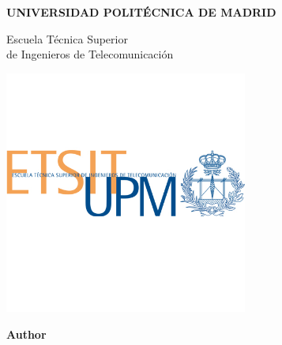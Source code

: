 \thispagestyle{empty}
\large
\begin{center}

  \Huge\textbf{UNIVERSIDAD POLITÉCNICA DE MADRID}

  \vspace{7mm}

  \huge{Escuela Técnica Superior\\de Ingenieros de Telecomunicación}

  \vspace{1cm}
  
  \centerline{\includegraphics[width=80mm]{logos/logoetsit_tamano.jpg}}


  \Large\textbf{\mybooktitle}

  
  {
    \textbf {Author}
  }
  {
    \textbf {\expandafter\makefirstuc\expandafter{\mybookAutorOrAutora}}
  }
  
  
  \myAuthorFullName
  
  \vspace{1cm}
  
  {
    \textbf {\expandafter\makefirstuc\expandafter{\mybookAdvisorOrAdvisors}}
  }
  {
    \textbf {\expandafter\makefirstuc\expandafter{\mybookDirectorOrDirectores}}
  }  
  
  \mybookadvisors
  
\end{center}

\begin{bottomparagraph}
  \begin{center}
    \textbf{\myThesisDefenseYear}\\
    \vspace{5mm}
    \textbf{\mybookworktypefull}
  \end{center}
\end{bottomparagraph}


\normalsize

\clearemptydoublepage




